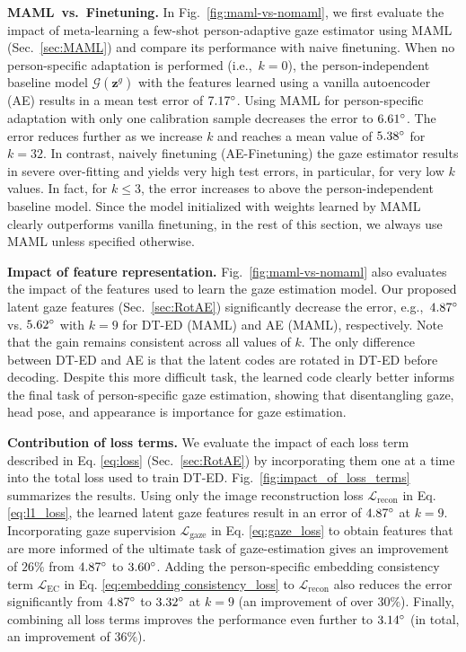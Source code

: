 \documentclass[10pt,twocolumn,letterpaper]{article}
\newcommand{\Paragraph}[1]
{\vspace{1.5mm} \noindent \textbf{#1}}
\def\ie{i.e.,~}
\def\eg{e.g.,~}
\begin{document}
\Paragraph{MAML~vs.~Finetuning.} In  Fig.~\ref{fig:maml-vs-nomaml}, we first evaluate the impact of meta-learning a few-shot person-adaptive gaze estimator using MAML (Sec.~\ref{sec:MAML}) and compare its performance with naive finetuning. When no person-specific adaptation is performed (\ie $k=0$), the person-independent baseline model $\mathcal{G}\left(\mathbf{z}^g\right)$ with the features learned using a vanilla autoencoder (AE) 
results in a mean test error of $7.17\degree$. Using MAML for person-specific adaptation with only one calibration sample decreases the error to $6.61\degree$. The error reduces further as we increase $k$ and reaches a mean value of $5.38\degree$ for $k=32$. 
In contrast, naively finetuning (AE-Finetuning) the gaze estimator results in severe over-fitting and yields very high test errors, in particular, for very low $k$ values. In fact, for $k \le 3$, the error increases to above the person-independent baseline model. Since the model initialized with weights learned by MAML clearly outperforms vanilla finetuning, in the rest of this section, we always use MAML unless specified otherwise.

\Paragraph{Impact of feature representation.} Fig.~\ref{fig:maml-vs-nomaml} also evaluates the impact of the features used to learn the gaze estimation model. Our proposed latent gaze features (Sec.~\ref{sec:RotAE}) significantly decrease the error, \eg $4.87\degree$ vs. $5.62\degree$ with $k=9$ for DT-ED (MAML) and AE (MAML), respectively. Note that the gain remains consistent across all values of $k$. 
The only difference between DT-ED and AE is that the latent codes are rotated in DT-ED before decoding.
Despite this more difficult task, the learned code clearly better informs the final task of person-specific gaze estimation, showing that disentangling gaze, head pose, and appearance is importance for gaze estimation.


\Paragraph{Contribution of loss terms.} We evaluate the impact of each loss term described in Eq. \eqref{eq:loss} (Sec.~\ref{sec:RotAE}) by incorporating them one at a time into the total loss used to train DT-ED. Fig.~\ref{fig:impact_of_loss_terms} summarizes the results. Using only the image reconstruction loss $\mathcal{L_{\mathrm{recon}}}$ in Eq. \eqref{eq:l1_loss}, the learned latent gaze features result in an error of $4.87\degree$ at $k=9$. Incorporating gaze supervision $\mathcal{L}_{\mathrm{gaze}}$ in Eq. \eqref{eq:gaze_loss} to obtain features that are more informed of the ultimate task of gaze-estimation gives an improvement of $26\%$ from $4.87\degree$ to $3.60\degree$. Adding the person-specific embedding consistency term  $\mathcal{L}_{\mathrm{EC}}$ in Eq. \eqref{eq:embedding consistency_loss} to $\mathcal{L}_{\mathrm{recon}}$ also reduces the error significantly from $4.87\degree$ to $3.32\degree$ at $k=9$ (an improvement of over $30\%$). 
Finally, combining all loss terms improves the performance even further
to $3.14\degree$ (in total, an improvement of $36\%$).
\end{document}

